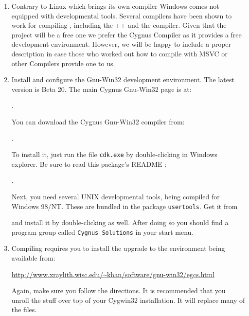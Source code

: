 \begin{enumerate}
\item Contrary to Linux which brings its own compiler Windows comes
not equipped with developmental tools. Several compilers have been shown to work for
compiling {\FlightGear}, including the ++ and the
 compiler. Given that the project will be a free one we prefer the
Cygnus Compiler as it provides a free development environment. However, we will be happy
to include a proper description in case those who worked out how to compile with MSVC or
other Compilers provide one to us.

\item  Install and configure the  Gnu-Win32 development
    environment. The latest version is Beta 20. The main
    Cygnus Gnu-Win32 page is at:

        .

 \noindent
    You can download the Cygnus Gnu-Win32 compiler from:

        .

 \noindent
    To install it, just run the file \texttt{cdk.exe} by double-clicking in
    Windows explorer. Be sure to read this package's README :

        .

 \noindent
    Next, you need several UNIX developmental tools, being compiled for
    Windows 98/NT. These are bundled in the package \texttt{usertools}. Get it
    from


 \noindent
    and install it by double-clicking as well. After doing so you should
    find a program group called \texttt{Cygnus Solutions} in your start menu.

\item  Compiling \FlightGear requires you to install the 
upgrade to the  environment being available from:

\href{http://www.xraylith.wisc.edu/~khan/software/gnu-win32/egcs.html}{http://www.xraylith.wisc.edu/\~{}khan/software/gnu-win32/egcs.html}


 \noindent
    Again, make sure you follow the directions. It is recommended that you unroll the
     stuff over top of your Cygwin32 installation.  It will replace many of
    the files.


\end{enumerate}
